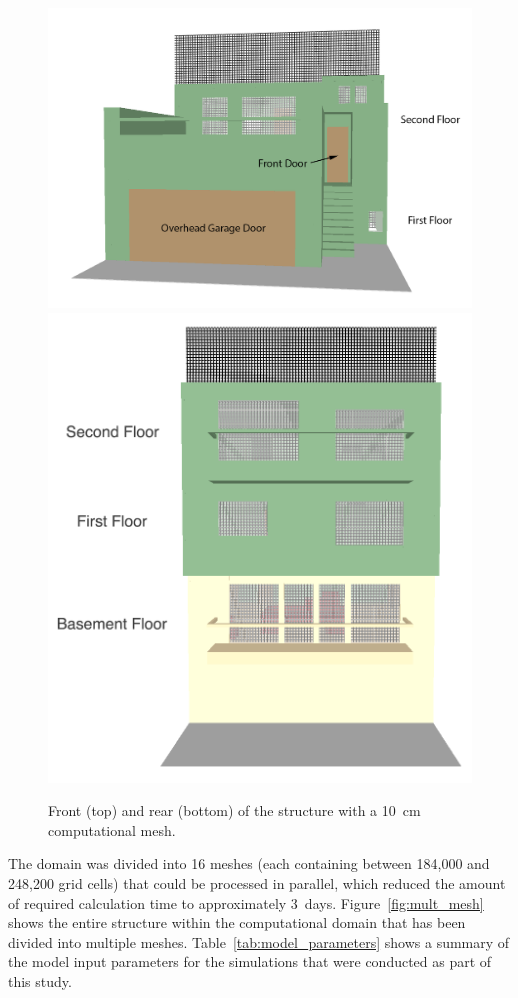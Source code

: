 \documentclass[12pt,oneside]{book}
\begin{document}
\begin{figure}[!ht]
\includegraphics[width=5.0in]{../Figures/SMV_Exterior_Grid_Front} \\
\includegraphics[width=4.5in]{../Figures/SMV_Exterior_Grid_Rear}
\caption{Front (top) and rear (bottom) of the structure with a 10~cm computational mesh.}
\label{fig:SMV_exterior_grid}
\end{figure}


\clearpage


The domain was divided into 16 meshes (each containing between 184,000 and 248,200 grid cells) that could be processed in parallel, which reduced the amount of required calculation time to approximately 3~days. Figure~\ref{fig:mult_mesh} shows the entire structure within the computational domain that has been divided into multiple meshes. Table~\ref{tab:model_parameters} shows a summary of the model input parameters for the simulations that were conducted as part of this study.
\end{document}
